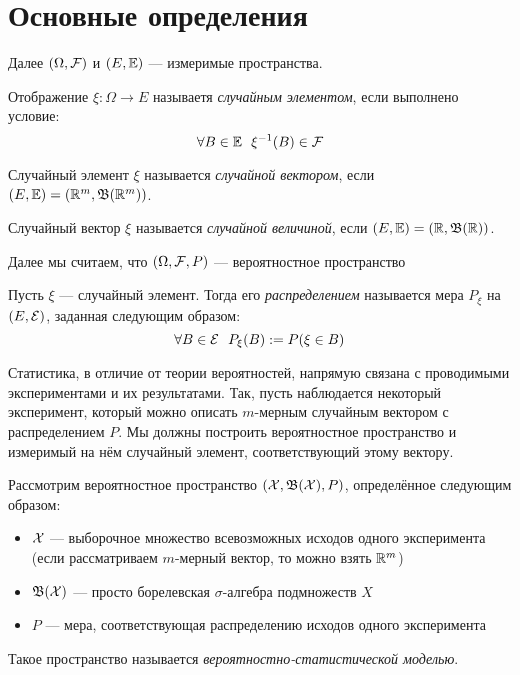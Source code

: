 \section{Основные определения}

\begin{note}
	Далее $(\Omega, \mathcal{F})$ и $(E, \mathbb{E})$ --- измеримые пространства.
\end{note}

\begin{definition}
	Отображение $\xi \colon \Omega \to E$ называетя \textit{случайным элементом}, если выполнено условие:
	\[
		\forall B \in \mathbb{E}\ \ \xi^{-1}(B) \in \mathcal{F}
	\]
\end{definition}

\begin{definition}
	Случайный элемент $\xi$ называется \textit{случайной вектором}, если $(E, \mathbb{E}) = (\mathbb{R}^m, \mathfrak{B}(\mathbb{R}^m))$.
\end{definition}

\begin{definition}
	Случайный вектор $\xi$ называется \textit{случайной величиной}, если $(E, \mathbb{E}) = (\mathbb{R}, \mathfrak{B}(\mathbb{R}))$.
\end{definition}

\begin{note}
	Далее мы считаем, что $(\Omega, \mathcal{F}, P)$ --- вероятностное пространство
\end{note}

\begin{definition}
	Пусть $\xi$ --- случайный элемент. Тогда его \textit{распределением} называется мера $P_\xi$ на $(E, \mathcal{E})$, заданная следующим образом:
	\[
		\forall B \in \mathcal{E}\ \ P_\xi(B) := P(\xi \in B)
	\]
\end{definition}

\begin{note}
	Статистика, в отличие от теории вероятностей, напрямую связана с проводимыми экспериментами и их результатами. Так, пусть наблюдается некоторый эксперимент, который можно описать $m$-мерным случайным вектором с распределением $P$. Мы должны построить вероятностное пространство и измеримый на нём случайный элемент, соответствующий этому вектору. 
\end{note}

\begin{definition}
	Рассмотрим вероятностное пространство $(\mathcal{X}, \mathfrak{B}(\mathcal{X}), P)$, определённое следующим образом:
	\begin{itemize}
		\item $\mathcal{X}$ --- выборочное множество всевозможных исходов одного эксперимента (если рассматриваем $m$-мерный вектор, то можно взять $\mathbb{R}^m$)
		
		\item $\mathfrak{B}(\mathcal{X})$ --- просто борелевская $\sigma$-алгебра подмножеств $X$
		
		\item $P$ --- мера, соответствующая распределению исходов одного эксперимента
	\end{itemize}
	Такое пространство называется \textit{вероятностно-статистической моделью}.
\end{definition}


